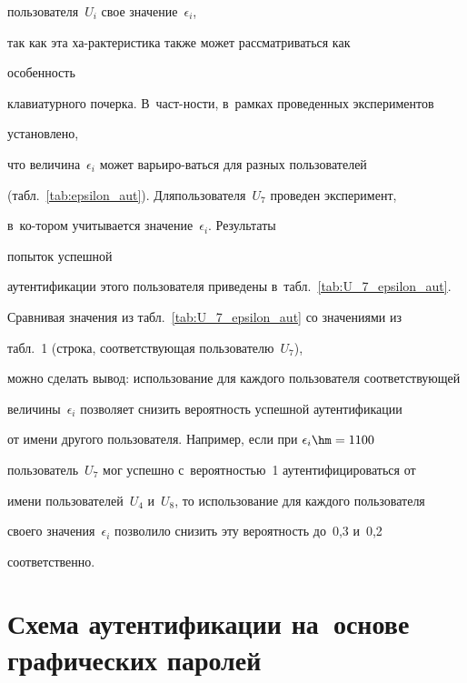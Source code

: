  пользователя~$U_i$ свое значение~$\epsilon_i$,


 так как эта ха-\linebreak рактеристика также может рассматриваться как\linebreak


  особенность


  клавиатурного почерка. В~част-\linebreak ности, в~рамках проведенных экспериментов\linebreak


   установлено, 


  что величина~$\epsilon_i$ может варьиро-\linebreak ваться для разных пользователей 


  (табл.~\ref{tab:epsilon_aut}). Для\linebreak пользователя~$U_7$ проведен эксперимент, 


   в~ко-\hspace*{54.5mm}\linebreak тором учитывается значение~$\epsilon_i$. Результаты\hspace*{54.5mm}\linebreak


    попыток успешной 


   аутентификации этого пользователя приведены в~табл.~\ref{tab:U_7_epsilon_aut}. 


   Сравнивая значения из табл.~\ref{tab:U_7_epsilon_aut} со значениями из 


   табл.~1 (строка, со\-от\-вет\-ст\-ву\-ющая пользователю~$U_7$), 


   можно сделать вывод: использование для каждого пользователя соответствующей 


   величины~$\epsilon_i$ позволяет снизить вероятность успешной аутентификации 


   от имени другого пользователя. Например, если при $\epsilon_i\hm=1100$


    пользователь~$U_7$ мог успешно с~вероятностью~1 аутентифицироваться от 


    имени пользователей~$U_4$ и~$U_8$, то использование для каждого пользователя 


    своего значения~$\epsilon_i$ позволило снизить эту вероятность до~0,3 и~0,2 


    соответственно.


    


    \section{Схема аутентификации на~основе графических паролей}


